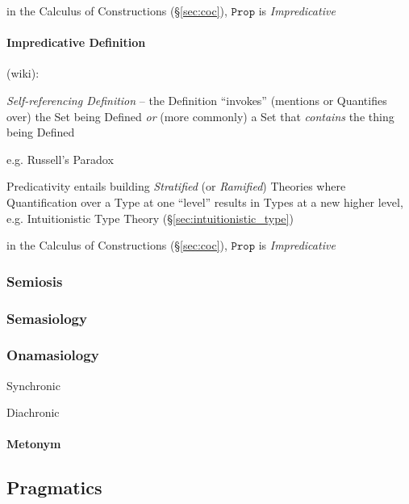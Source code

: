 in the Calculus of Constructions (\S\ref{sec:coc}), $\mathtt{Prop}$ is
\emph{Impredicative}


\paragraph{Impredicative Definition}\label{sec:impredicative_definition}\hfill

(wiki):

\emph{Self-referencing Definition} -- the Definition ``invokes'' (mentions or
Quantifies over) the Set being Defined \emph{or} (more commonly) a Set that
\emph{contains} the thing being Defined

e.g. Russell's Paradox

Predicativity entails building \emph{Stratified} (or \emph{Ramified}) Theories
where Quantification over a Type at one ``level'' results in Types at a new
higher level, e.g. Intuitionistic Type Theory (\S\ref{sec:intuitionistic_type})

in the Calculus of Constructions (\S\ref{sec:coc}), $\mathtt{Prop}$ is
\emph{Impredicative}



\subsubsection{Semiosis}\label{sec:semiosis}

\subsubsection{Semasiology}\label{sec:semasiology}

\subsubsection{Onamasiology}\label{sec:onamasiology}

Synchronic

Diachronic

\paragraph{Metonym}\label{sec:metonym}\hfill



\subsection{Pragmatics}\label{sec:pragmatics}

